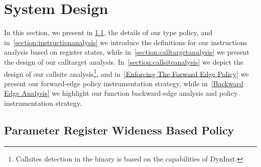 \section{System Design}
\label{chapter:Design}

In this section, we present 
in \cref{section:typepolicy}, the details of our type policy, and 
in~\cref{section:instructionanalysis} we introduce the definitions for our instructions analysis based on register states, while
in~\cref{section:calltargetanalysis} we present the design of our calltarget analysis.
In~\cref{section:callsiteanalysis} we depict the design of our callsite analysis\footnote{Callsites detection in the 
binary is based on the capabilities of DynInst.}, and  
in~\cref{Enforcing The Forward Edge Policy} we present our forward-edge policy instrumentation strategy, while 
in~\cref{Backward Edge Analysis} we highlight our function backward-edge analysis and policy instrumentation strategy.

\subsection{Parameter Register Wideness Based Policy}
\label{section:typepolicy}

